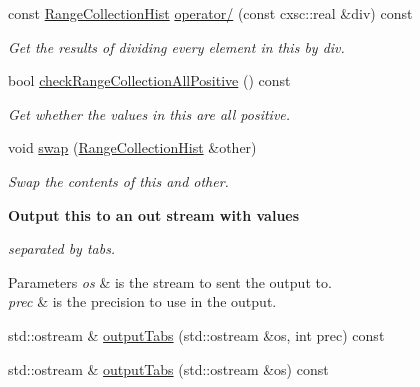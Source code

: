 \begin{DoxyCompactItemize}
const \hyperlink{classsubpavings_1_1RangeCollectionHist}{\-Range\-Collection\-Hist} \hyperlink{classsubpavings_1_1RangeCollectionHist_a93a520db202a1032ec1e1b02014c10a8}{operator/} (const cxsc\-::real \&div) const 
\begin{DoxyCompactList}\small\item\em \-Get the results of dividing every element in this by {\itshape div\/}. \end{DoxyCompactList}\item 
bool \hyperlink{classsubpavings_1_1RangeCollectionHist_ae8047b013a97315564303752a329ff45}{check\-Range\-Collection\-All\-Positive} () const 
\begin{DoxyCompactList}\small\item\em \-Get whether the values in this are all positive. \end{DoxyCompactList}\item 
void \hyperlink{classsubpavings_1_1RangeCollectionHist_a265fa98459a9c678e980d111922bfddd}{swap} (\hyperlink{classsubpavings_1_1RangeCollectionHist}{\-Range\-Collection\-Hist} \&other)
\begin{DoxyCompactList}\small\item\em \-Swap the contents of this and other. \end{DoxyCompactList}\end{DoxyCompactItemize}
\begin{Indent}{\bf \-Output this to an out stream with values}\par
{\em separated by tabs.


\begin{DoxyParams}{\-Parameters}
{\em os} & is the stream to sent the output to. \\
\hline
{\em prec} & is the precision to use in the output. \\
\hline
\end{DoxyParams}
}\begin{DoxyCompactItemize}
\item 
std\-::ostream \& \hyperlink{classsubpavings_1_1RangeCollectionHist_ac34a42f1ad337dc961cda4386bcefd99}{output\-Tabs} (std\-::ostream \&os, int prec) const 
\item 
std\-::ostream \& \hyperlink{classsubpavings_1_1RangeCollectionHist_ac005c11b0948f40d1a334f9d462d10c6}{output\-Tabs} (std\-::ostream \&os) const 
\end{DoxyCompactItemize}
\end{Indent}
